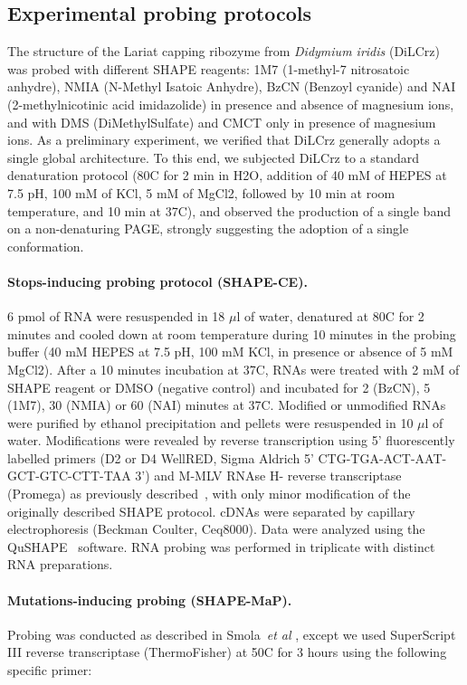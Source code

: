 \documentclass[a4,center,fleqn]{NAR}
\newcommand{\etal}{~\emph{et al} }
\begin{document}
\subsection*{Experimental probing protocols}
The structure of the Lariat capping ribozyme from \textit{Didymium iridis }(DiLCrz) was probed with different SHAPE reagents: 1M7 (1-methyl-7 nitrosatoic anhydre), NMIA (N-Methyl Isatoic Anhydre), BzCN (Benzoyl cyanide) and NAI (2-methylnicotinic acid imidazolide) in presence and absence of magnesium ions, and with DMS (DiMethylSulfate) and CMCT only in presence of magnesium ions.
As a preliminary experiment, we verified that DiLCrz generally adopts a single global architecture. To this end, we subjected DiLCrz to a standard denaturation protocol (80\degree{}C for 2 min in H2O, addition of 40 mM of HEPES at 7.5 pH, 100 mM of KCl, 5 mM of MgCl2, followed by 10 min at room temperature, and 10 min at 37\degree{}C), and observed the production of a single band on a non-denaturing PAGE, strongly suggesting the adoption of a single conformation.

\paragraph{Stops-inducing probing protocol (SHAPE-CE).} 
6 pmol of RNA were resuspended in 18 $\mu$l of water, denatured at 80\degree{}C for 2 minutes and cooled down at room temperature during 10 minutes in the probing buffer (40 mM HEPES at 7.5 pH, 100 mM KCl, in presence or absence of 5 mM MgCl2). After a 10 minutes incubation at 37\degree{}C, RNAs were treated with 2 mM of SHAPE reagent or DMSO (negative control) and incubated for 2 (BzCN), 5 (1M7), 30 (NMIA) or 60 (NAI) minutes at 37\degree{}C. Modified or unmodified RNAs were purified by ethanol precipitation and pellets were resuspended in 10 $\mu$l of water.
Modifications were revealed by reverse transcription using 5’ fluorescently labelled primers (D2 or D4 WellRED, Sigma Aldrich 5’ CTG-TGA-ACT-AAT-GCT-GTC-CTT-TAA 3’) and M-MLV RNAse H- reverse transcriptase (Promega) as previously described~\cite{Deforges2017}, with only minor modification of the originally described SHAPE protocol\cite{Wilkinson2006}. cDNAs were separated by capillary electrophoresis (Beckman Coulter, Ceq8000). Data were analyzed using the  QuSHAPE~\cite{Karabiber2013} software. RNA probing was performed in triplicate with distinct RNA preparations.

\paragraph{Mutations-inducing probing (SHAPE-MaP).}
Probing was conducted as described in Smola\etal\cite{Smola2015}, except we used SuperScript III reverse transcriptase (ThermoFisher) at 50\degree{}C for 3 hours using the following specific primer: 
\end{document}

